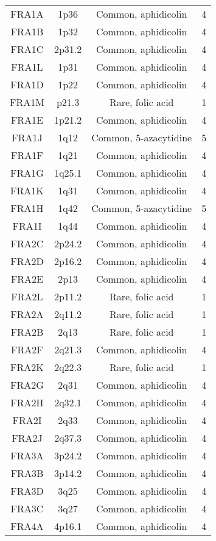 \begin{center}
\begin{longtable}{cccc}
FRA1A  & 1p36     & Common, aphidicolin   & 4 \\
FRA1B  & 1p32     & Common, aphidicolin   & 4 \\
FRA1C  & 2p31.2   & Common, aphidicolin   & 4 \\
FRA1L  & 1p31     & Common, aphidicolin   & 4 \\
FRA1D  & 1p22     & Common, aphidicolin   & 4 \\
FRA1M  & p21.3    & Rare, folic acid      & 1 \\
FRA1E  & 1p21.2   & Common, aphidicolin   & 4 \\
FRA1J  & 1q12     & Common, 5-azacytidine & 5 \\
FRA1F  & 1q21     & Common, aphidicolin   & 4 \\
FRA1G  & 1q25.1   & Common, aphidicolin   & 4 \\
FRA1K  & 1q31     & Common, aphidicolin   & 4 \\
FRA1H  & 1q42     & Common, 5-azacytidine & 5 \\
FRA1I  & 1q44     & Common, aphidicolin   & 4 \\
FRA2C  & 2p24.2   & Common, aphidicolin   & 4 \\
FRA2D  & 2p16.2   & Common, aphidicolin   & 4 \\
FRA2E  & 2p13     & Common, aphidicolin   & 4 \\
FRA2L  & 2p11.2   & Rare, folic acid      & 1 \\
FRA2A  & 2q11.2   & Rare, folic acid      & 1 \\
FRA2B  & 2q13     & Rare, folic acid      & 1 \\
FRA2F  & 2q21.3   & Common, aphidicolin   & 4 \\
FRA2K  & 2q22.3   & Rare, folic acid      & 1 \\
FRA2G  & 2q31     & Common, aphidicolin   & 4 \\
FRA2H  & 2q32.1   & Common, aphidicolin   & 4 \\
FRA2I  & 2q33     & Common, aphidicolin   & 4 \\
FRA2J  & 2q37.3   & Common, aphidicolin   & 4 \\
FRA3A  & 3p24.2   & Common, aphidicolin   & 4 \\
FRA3B  & 3p14.2   & Common, aphidicolin   & 4 \\
FRA3D  & 3q25     & Common, aphidicolin   & 4 \\
FRA3C  & 3q27     & Common, aphidicolin   & 4 \\
FRA4A  & 4p16.1   & Common, aphidicolin   & 4 \\

\end{longtable}
\end{center}
